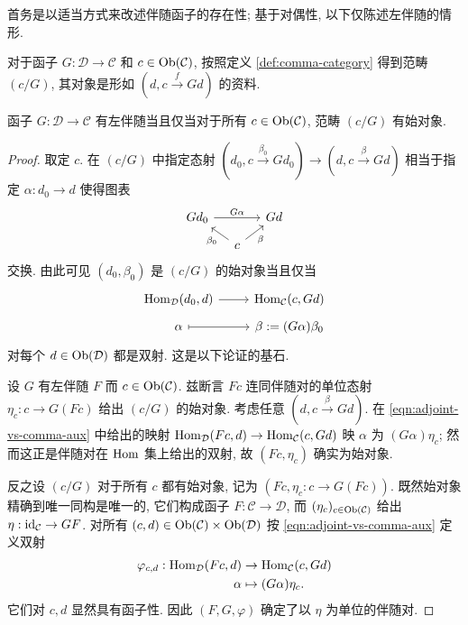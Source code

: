 首务是以适当方式来改述伴随函子的存在性; 基于对偶性, 以下仅陈述左伴随的情形.

对于函子 $G: \mathcal{D} \to \mathcal{C}$ 和 $c \in \operatorname{Ob}(\mathcal{C})$, 按照定义 \ref{def:comma-category} 得到范畴 $(c/G)$, 其对象是形如 $(d, c \xrightarrow{f} Gd)$ 的资料.

\begin{lemma}\label{prop:adjoint-vs-comma}
	函子 $G: \mathcal{D} \to \mathcal{C}$ 有左伴随当且仅当对于所有 $c \in \operatorname{Ob}(\mathcal{C})$, 范畴 $(c/G)$ 有始对象.
\end{lemma}
\begin{proof}
	取定 $c$. 在 $(c/G)$ 中指定态射 $(d_0, c \xrightarrow{\beta_0} Gd_0) \to (d, c \xrightarrow{\beta} Gd)$ 相当于指定 $\alpha: d_0 \to d$ 使得图表
	\[\begin{tikzcd}[row sep=small, column sep=small]
		Gd_0 \arrow[rr, "G\alpha"] & & Gd \\
		& c \arrow[lu, "\beta_0"] \arrow[ru, "\beta"'] &
	\end{tikzcd}\]
	交换. 由此可见 $(d_0, \beta_0)$ 是 $(c/G)$ 的始对象当且仅当
	\begin{equation}\label{eqn:adjoint-vs-comma-aux}\begin{tikzcd}[row sep=tiny]
		\Hom_{\mathcal{D}}(d_0, d) \arrow[r] & \Hom_{\mathcal{C}}(c, Gd) \\
		\alpha \arrow[mapsto, r] & \beta := (G\alpha) \beta_0
	\end{tikzcd}\end{equation}
	对每个 $d \in \operatorname{Ob}(\mathcal{D})$ 都是双射. 这是以下论证的基石.

	设 $G$ 有左伴随 $F$ 而 $c \in \operatorname{Ob}(\mathcal{C})$. 兹断言 $Fc$ 连同伴随对的单位态射 $\eta_c: c \to G(Fc)$ 给出 $(c/G)$ 的始对象. 考虑任意 $(d, c \xrightarrow{\beta} Gd)$. 在 \eqref{eqn:adjoint-vs-comma-aux} 中给出的映射 $\operatorname{Hom}_{\mathcal{D}}(Fc, d) \to \operatorname{Hom}_{\mathcal{C}}(c, Gd)$ 映 $\alpha$ 为 $(G\alpha) \eta_c$; 然而这正是伴随对在 $\operatorname{Hom}$ 集上给出的双射, 故 $(Fc, \eta_c)$ 确实为始对象.
	
	反之设 $(c/G)$ 对于所有 $c$ 都有始对象, 记为 $(Fc, \eta_c: c \to G(Fc))$. 既然始对象精确到唯一同构是唯一的, 它们构成函子 $F: \mathcal{C} \to \mathcal{D}$, 而 $(\eta_c)_{c \in \operatorname{Ob}(\mathcal{C})}$ 给出 $\eta: \mathrm{id}_{\mathcal{C}} \to GF$. 对所有 $(c, d) \in \operatorname{Ob}(\mathcal{C}) \times \operatorname{Ob}(\mathcal{D})$ 按 \eqref{eqn:adjoint-vs-comma-aux} 定义双射
	\begin{align*}
		\varphi_{c, d}: \operatorname{Hom}_{\mathcal{D}}(Fc, d) & \to \operatorname{Hom}_{\mathcal{C}}(c, Gd) \\
		\alpha & \mapsto (G\alpha) \eta_c.
	\end{align*}
	它们对 $c, d$ 显然具有函子性. 因此 $(F, G, \varphi)$ 确定了以 $\eta$ 为单位的伴随对.
\end{proof}

